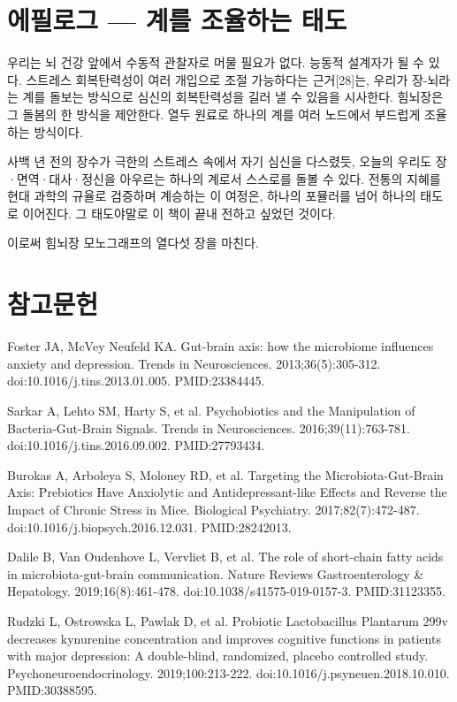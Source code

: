 \documentclass[12pt,oneside]{book}
\newcommand{\refstart}{\par\begingroup\fontsize{8.5pt}{10.2pt}\selectfont\setlength{\parskip}{1.4pt}\raggedright}
\newcommand{\reff}[2]{\par\hangindent=7mm\hangafter=1\noindent[#1]\hspace{2mm}#2\par}
\begin{document}
\section{에필로그 — 계를 조율하는 태도}

우리는 뇌 건강 앞에서 수동적 관찰자로 머물 필요가 없다. 능동적 설계자가 될 수 있다. 스트레스 회복탄력성이 여러 개입으로 조절 가능하다는 근거[28]는, 우리가 장-뇌라는 계를 돌보는 방식으로 심신의 회복탄력성을 길러 낼 수 있음을 시사한다. 힘뇌장은 그 돌봄의 한 방식을 제안한다. 열두 원료로 하나의 계를 여러 노드에서 부드럽게 조율하는 방식이다.

사백 년 전의 장수가 극한의 스트레스 속에서 자기 심신을 다스렸듯, 오늘의 우리도 장·면역·대사·정신을 아우르는 하나의 계로서 스스로를 돌볼 수 있다. 전통의 지혜를 현대 과학의 규율로 검증하며 계승하는 이 여정은, 하나의 포뮬러를 넘어 하나의 태도로 이어진다. 그 태도야말로 이 책이 끝내 전하고 싶었던 것이다.

이로써 힘뇌장 모노그래프의 열다섯 장을 마친다.

\section*{참고문헌}

\refstart

\reff{1}{Foster JA, McVey Neufeld KA. Gut-brain axis: how the microbiome influences anxiety and depression. Trends in Neurosciences. 2013;36(5):305-312. doi:10.1016/j.tins.2013.01.005. PMID:23384445.}

\reff{2}{Sarkar A, Lehto SM, Harty S, et al. Psychobiotics and the Manipulation of Bacteria-Gut-Brain Signals. Trends in Neurosciences. 2016;39(11):763-781. doi:10.1016/j.tins.2016.09.002. PMID:27793434.}

\reff{3}{Burokas A, Arboleya S, Moloney RD, et al. Targeting the Microbiota-Gut-Brain Axis: Prebiotics Have Anxiolytic and Antidepressant-like Effects and Reverse the Impact of Chronic Stress in Mice. Biological Psychiatry. 2017;82(7):472-487. doi:10.1016/j.biopsych.2016.12.031. PMID:28242013.}

\reff{4}{Dalile B, Van Oudenhove L, Vervliet B, et al. The role of short-chain fatty acids in microbiota-gut-brain communication. Nature Reviews Gastroenterology \& Hepatology. 2019;16(8):461-478. doi:10.1038/s41575-019-0157-3. PMID:31123355.}

\reff{5}{Rudzki L, Ostrowska L, Pawlak D, et al. Probiotic Lactobacillus Plantarum 299v decreases kynurenine concentration and improves cognitive functions in patients with major depression: A double-blind, randomized, placebo controlled study. Psychoneuroendocrinology. 2019;100:213-222. doi:10.1016/j.psyneuen.2018.10.010. PMID:30388595.}
\end{document}
